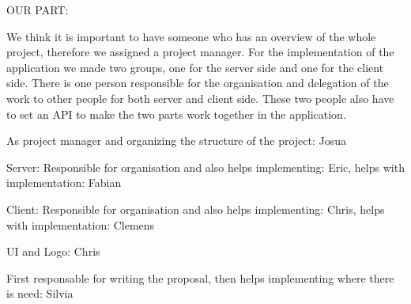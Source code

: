 \documentclass{report}
\begin{document}
OUR PART:


We think it is important to have someone who has an overview of the whole project, therefore we assigned a project manager. For the implementation of the application we made two groups, one for the server side and one for the client side. There is one person responsible for the organisation and delegation of the work to other people for both server and client side. These two people also have to set an API to make the two parts work together in the application.

As project manager and organizing the structure of the project: Josua

Server: Responsible for organisation and also helps implementing: Eric, helps with implementation: Fabian

Client: Responsible for organisation and also helps implementing: Chris, helps with implementation: Clemens

UI and Logo: Chris

First responsable for writing the proposal, then helps implementing where there is need: Silvia




\end{document}
